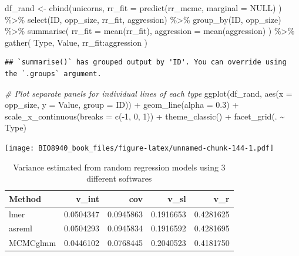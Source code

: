 \documentclass[
  12pt,
]{book}
\newenvironment{Shaded}{\begin{snugshade}}{\end{snugshade}}
\newcommand{\AttributeTok}[1]{\textcolor[rgb]{0.77,0.63,0.00}{#1}}
\newcommand{\CommentTok}[1]{\textcolor[rgb]{0.56,0.35,0.01}{\textit{#1}}}
\newcommand{\ConstantTok}[1]{\textcolor[rgb]{0.00,0.00,0.00}{#1}}
\newcommand{\DecValTok}[1]{\textcolor[rgb]{0.00,0.00,0.81}{#1}}
\newcommand{\FloatTok}[1]{\textcolor[rgb]{0.00,0.00,0.81}{#1}}
\newcommand{\FunctionTok}[1]{\textcolor[rgb]{0.00,0.00,0.00}{#1}}
\newcommand{\NormalTok}[1]{#1}
\newcommand{\OtherTok}[1]{\textcolor[rgb]{0.56,0.35,0.01}{#1}}
\newcommand{\SpecialCharTok}[1]{\textcolor[rgb]{0.00,0.00,0.00}{#1}}
\begin{document}
\begin{Shaded}
\begin{Highlighting}[]
\NormalTok{df\_rand }\OtherTok{\textless{}{-}} \FunctionTok{cbind}\NormalTok{(unicorns,}
  \AttributeTok{rr\_fit =} \FunctionTok{predict}\NormalTok{(rr\_mcmc, }\AttributeTok{marginal =} \ConstantTok{NULL}\NormalTok{)}
\NormalTok{) }\SpecialCharTok{\%\textgreater{}\%}
  \FunctionTok{select}\NormalTok{(ID, opp\_size, rr\_fit, aggression) }\SpecialCharTok{\%\textgreater{}\%}
  \FunctionTok{group\_by}\NormalTok{(ID, opp\_size) }\SpecialCharTok{\%\textgreater{}\%}
  \FunctionTok{summarise}\NormalTok{(}
    \AttributeTok{rr\_fit =} \FunctionTok{mean}\NormalTok{(rr\_fit),}
    \AttributeTok{aggression =} \FunctionTok{mean}\NormalTok{(aggression)}
\NormalTok{  ) }\SpecialCharTok{\%\textgreater{}\%}
  \FunctionTok{gather}\NormalTok{(}
\NormalTok{    Type, Value,}
\NormalTok{    rr\_fit}\SpecialCharTok{:}\NormalTok{aggression}
\NormalTok{  )}
\end{Highlighting}
\end{Shaded}

\begin{verbatim}
## `summarise()` has grouped output by 'ID'. You can override using the `.groups` argument.
\end{verbatim}

\begin{Shaded}
\begin{Highlighting}[]
\CommentTok{\# Plot separate panels for individual lines of each type}
\FunctionTok{ggplot}\NormalTok{(df\_rand, }\FunctionTok{aes}\NormalTok{(}\AttributeTok{x =}\NormalTok{ opp\_size, }\AttributeTok{y =}\NormalTok{ Value, }\AttributeTok{group =}\NormalTok{ ID)) }\SpecialCharTok{+}
  \FunctionTok{geom\_line}\NormalTok{(}\AttributeTok{alpha =} \FloatTok{0.3}\NormalTok{) }\SpecialCharTok{+}
  \FunctionTok{scale\_x\_continuous}\NormalTok{(}\AttributeTok{breaks =} \FunctionTok{c}\NormalTok{(}\SpecialCharTok{{-}}\DecValTok{1}\NormalTok{, }\DecValTok{0}\NormalTok{, }\DecValTok{1}\NormalTok{)) }\SpecialCharTok{+}
  \FunctionTok{theme\_classic}\NormalTok{() }\SpecialCharTok{+}
  \FunctionTok{facet\_grid}\NormalTok{(. }\SpecialCharTok{\textasciitilde{}}\NormalTok{ Type)}
\end{Highlighting}
\end{Shaded}

\texttt{[image: BIO8940\_book\_files/figure-latex/unnamed-chunk-144-1.pdf]}

\begin{table}

\caption{\label{tab:unnamed-chunk-145}Variance estimated from random regression models using 3 different softwares}
\centering
\begin{tabular}[t]{l|r|r|r|r}
\hline
Method & v\_int & cov & v\_sl & v\_r\\
\hline
lmer & 0.0504347 & 0.0945863 & 0.1916653 & 0.4281625\\
\hline
asreml & 0.0504293 & 0.0945834 & 0.1916592 & 0.4281695\\
\hline
MCMCglmm & 0.0446102 & 0.0768445 & 0.2040523 & 0.4181750\\
\hline
\end{tabular}
\end{table}
\end{document}
